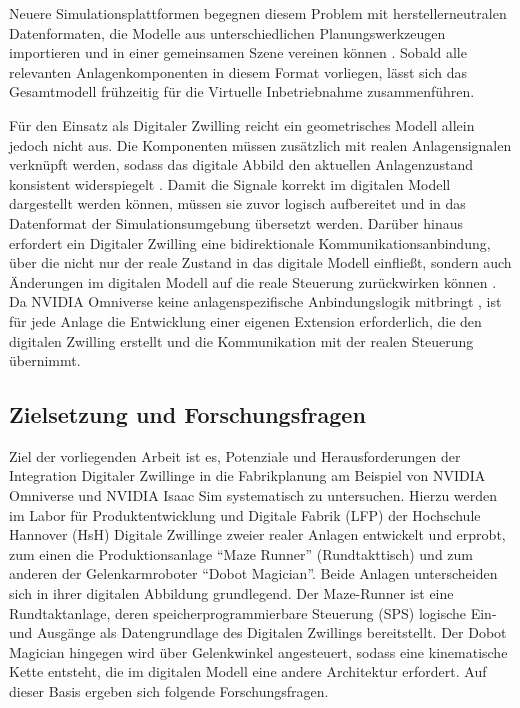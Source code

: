 Neuere Simulationsplattformen begegnen diesem Problem mit herstellerneutralen Datenformaten, die Modelle aus unterschiedlichen Planungswerkzeugen importieren und in einer gemeinsamen Szene vereinen können \cite{bmw_nvidia_2021,nvidia_omniverse}. Sobald alle relevanten Anlagenkomponenten in diesem Format vorliegen, lässt sich das Gesamtmodell frühzeitig für die Virtuelle Inbetriebnahme zusammenführen.

Für den Einsatz als Digitaler Zwilling reicht ein geometrisches Modell allein jedoch nicht aus. Die Komponenten müssen zusätzlich mit realen Anlagensignalen verknüpft werden, sodass das digitale Abbild den aktuellen Anlagenzustand konsistent widerspiegelt \cite{kritzinger2018}. Damit die Signale korrekt im digitalen Modell dargestellt werden können, müssen sie zuvor logisch aufbereitet und in das Datenformat der Simulationsumgebung übersetzt werden. Darüber hinaus erfordert ein Digitaler Zwilling eine bidirektionale Kommunikationsanbindung, über die nicht nur der reale Zustand in das digitale Modell einfließt, sondern auch Änderungen im digitalen Modell auf die reale Steuerung zurückwirken können \cite{kritzinger2018}. Da NVIDIA Omniverse keine anlagenspezifische Anbindungslogik mitbringt \cite{nvidia_omniverse}, ist für jede Anlage die Entwicklung einer eigenen Extension erforderlich, die den digitalen Zwilling erstellt und die Kommunikation mit der realen Steuerung übernimmt.

\subsection{Zielsetzung und Forschungsfragen}
Ziel der vorliegenden Arbeit ist es, Potenziale und Herausforderungen der Integration Digitaler Zwillinge in die Fabrikplanung am Beispiel von NVIDIA Omniverse und NVIDIA Isaac Sim systematisch zu untersuchen. Hierzu werden im Labor für Produktentwicklung und Digitale Fabrik (LFP) der Hochschule Hannover (HsH) Digitale Zwillinge zweier realer Anlagen entwickelt und erprobt, zum einen die Produktionsanlage \enquote{Maze Runner} (Rundtakttisch) und zum anderen der Gelenkarmroboter \enquote{Dobot Magician}. Beide Anlagen unterscheiden sich in ihrer digitalen Abbildung grundlegend. Der Maze-Runner ist eine Rundtaktanlage, deren speicherprogrammierbare Steuerung (SPS) logische Ein- und Ausgänge als Datengrundlage des Digitalen Zwillings bereitstellt. Der Dobot Magician hingegen wird über Gelenkwinkel angesteuert, sodass eine kinematische Kette entsteht, die im digitalen Modell eine andere Architektur erfordert. Auf dieser Basis ergeben sich folgende Forschungsfragen.

